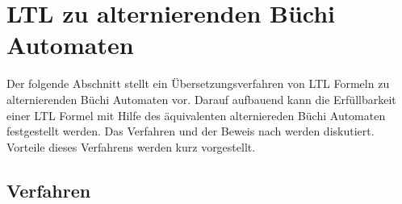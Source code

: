 \section{LTL zu alternierenden Büchi Automaten}

Der folgende Abschnitt stellt ein Übersetzungsverfahren von LTL Formeln zu alternierenden Büchi Automaten vor. Darauf aufbauend kann die Erfüllbarkeit einer LTL Formel mit Hilfe des äquivalenten alterniereden Büchi Automaten festgestellt werden. Das Verfahren und der Beweis nach \cite{vardi+96} werden diskutiert. Vorteile dieses Verfahrens werden kurz vorgestellt. 


\subsection{Verfahren}

